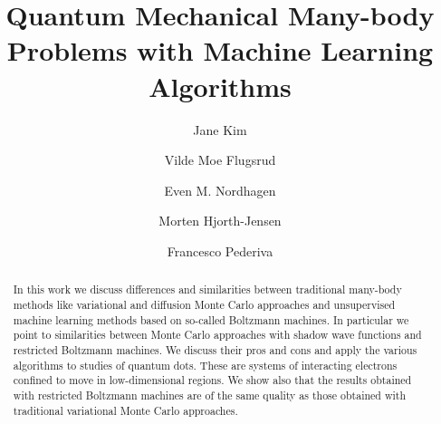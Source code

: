 \documentclass[aip,jcp,reprint,floatfix]{revtex4-1}
\begin{document}
\title{Quantum Mechanical Many-body Problems with Machine Learning Algorithms}

\author{Jane Kim}

\author{Vilde Moe Flugsrud}

\author{Even M. Nordhagen}


\author{Morten Hjorth-Jensen}

\author{Francesco Pederiva}

\begin{abstract}

In this work we discuss differences and similarities between
traditional many-body methods like variational and diffusion Monte
Carlo approaches and unsupervised machine learning methods based on
so-called Boltzmann machines. In particular we point to similarities
between Monte Carlo approaches with shadow wave functions and
restricted Boltzmann machines. We discuss their pros and cons and
apply the various algorithms to studies of quantum dots. These are
systems of interacting electrons confined to move in low-dimensional
regions. We show also that the results obtained with restricted Boltzmann machines are of the same quality as those obtained with traditional variational Monte Carlo approaches. 

\end{abstract}


\maketitle
\end{document}
